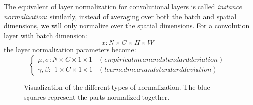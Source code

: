 The equivalent of layer normalization for convolutional layers is called \emph{instance normalization}: similarly, instead of averaging over both the batch and spatial dimensions, we will only normalize over the spatial dimensions. For a convolution layer with batch dimension:
\begin{equation*}
    x: N\times C\times H\times W
\end{equation*}
the layer normalization parameters become:
\begin{equation*}
    \begin{cases*}
        \mu, \sigma: N\times C\times 1\times 1 & (empirical mean and standard deviation)\\
        \gamma, \beta: \;\,1\times C\times 1\times 1 & (learned mean and standard deviation)
    \end{cases*}
\end{equation*}

\begin{figure}[H]
    \centering
    \caption{Visualization of the different types of normalization. The blue squares represent the parts normalized together.}
\end{figure}